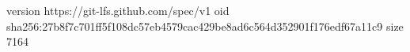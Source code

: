 version https://git-lfs.github.com/spec/v1
oid sha256:27b8f7c701ff5f108dc57eb4579cac429be8ad6c564d352901f176edf67a11c9
size 7164
